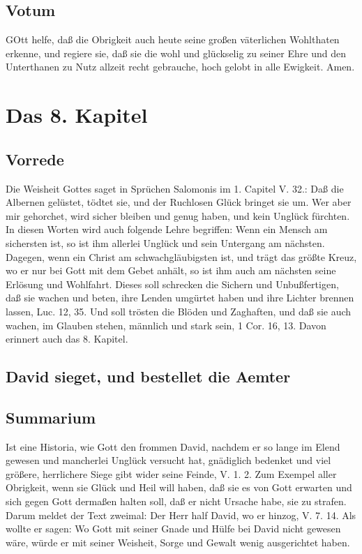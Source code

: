 \section{Votum}

GOtt helfe, daß die Obrigkeit auch heute seine großen väterlichen Wohlthaten erkenne, und regiere sie, daß sie die wohl und glückselig zu seiner Ehre und den Unterthanen zu Nutz allzeit recht gebrauche, hoch gelobt in alle Ewigkeit. Amen.

\chapter{Das 8. Kapitel}

\section{Vorrede}

Die Weisheit Gottes saget in Sprüchen Salomonis im 1. Capitel V. 32.: Daß die Albernen gelüstet, tödtet sie, und der Ruchlosen Glück bringet sie um. Wer aber mir gehorchet, wird sicher bleiben und genug haben, und kein Unglück fürchten. In diesen Worten wird auch folgende Lehre begriffen: Wenn ein Mensch am sichersten ist, so ist ihm allerlei Unglück und sein Untergang am nächsten. Dagegen, wenn ein Christ am schwachgläubigsten ist, und trägt das größte Kreuz, wo er nur bei Gott mit dem Gebet anhält, so ist ihm auch am nächsten seine Erlösung und Wohlfahrt. Dieses soll schrecken die Sichern und Unbußfertigen, daß sie wachen und beten, ihre Lenden umgürtet haben und ihre Lichter brennen lassen, Luc. 12, 35. Und soll trösten die Blöden und Zaghaften, und daß sie auch wachen, im Glauben stehen, männlich und stark sein, 1 Cor. 16, 13. Davon erinnert auch das 8. Kapitel.

\section{David sieget, und bestellet die Aemter}

\section{Summarium}

Ist eine Historia, wie Gott den frommen David, nachdem er so lange im Elend gewesen und mancherlei Unglück versucht hat, gnädiglich bedenket und viel größere, herrlichere Siege gibt wider seine Feinde, V. 1. 2. Zum Exempel aller Obrigkeit, wenn sie Glück und Heil will haben, daß sie es von Gott erwarten und sich gegen Gott dermaßen halten soll, daß er nicht Ursache habe, sie zu strafen. Darum meldet der Text zweimal: Der Herr half David, wo er hinzog, V. 7. 14. Als wollte er sagen: Wo Gott mit seiner Gnade und Hülfe bei David nicht gewesen wäre, würde er mit seiner Weisheit, Sorge und Gewalt wenig ausgerichtet haben.

